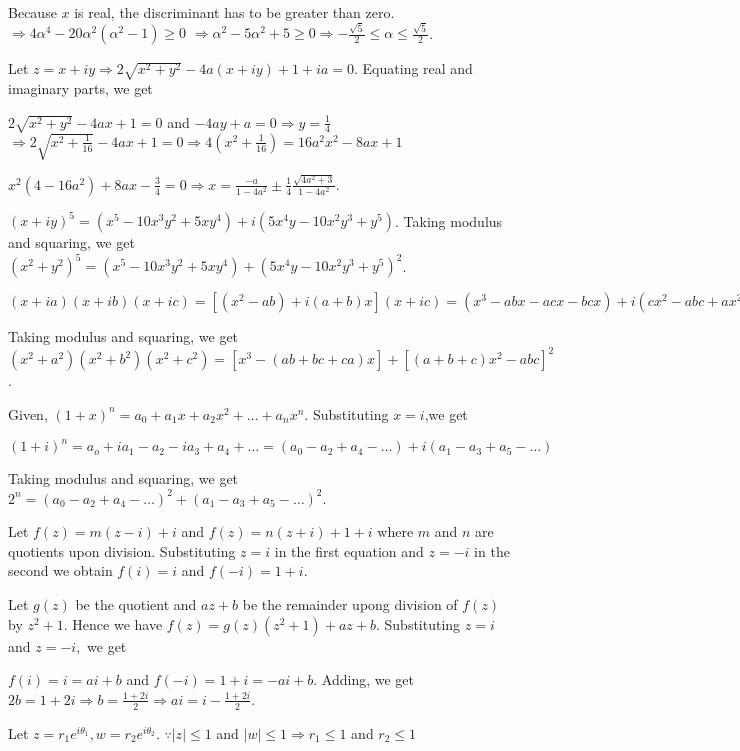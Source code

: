   Because $x$ is real, the discriminant has to be greater than zero.
  $\Rightarrow 4\alpha^4 - 20\alpha^2(\alpha^2 - 1) \geq 0$
  $\Rightarrow \alpha^2 - 5\alpha^2 + 5 \geq 0 \Rightarrow -\frac{\sqrt{5}}{2}\leq\alpha\leq
  \frac{\sqrt{5}}{2}$.
\item Let $z = x + iy \Rightarrow 2\sqrt{x^2 + y^2} - 4a(x + iy) + 1 + ia = 0$.
  Equating real and imaginary parts, we get

  $2\sqrt{x^2 + y^2} - 4ax + 1 = 0$ and $-4ay + a = 0 \Rightarrow y = \frac{1}{4}$
  $\Rightarrow 2\sqrt{x^2 + \frac{1}{16}} - 4ax + 1 = 0 \Rightarrow 4\left(x^2 + \frac{1}{16}\right) =
  16a^2x^2 - 8ax + 1$

  $x^2(4 - 16a^2) + 8ax - \frac{3}{4} = 0 \Rightarrow x = \frac{-a}{1 - 4a^2} \pm
  \frac{1}{4}\frac{\sqrt{4a^2 + 3}}{1 - 4a^2}$.
\item $(x + iy)^5 = (x^5 - 10x^3y^2 + 5xy^4) + i(5x^4y - 10x^2y^3 + y^5)$.
  Taking modulus and squaring, we get
  $(x^2 + y^2)^5 = (x^5 - 10x^3y^2 + 5xy^4) + (5x^4y - 10x^2y^3 + y^5)^2$.
\item $(x + ia)(x + ib)(x + ic) = [(x^2 - ab) + i(a + b)x](x + ic) = (x^3 - abx - acx - bcx) + i(cx^2 - abc
  + ax^2 + bx^2)$

  Taking modulus and squaring, we get $(x^2 + a^2)(x^2 + b^2)(x^2 + c^2) = [x^3 -(ab + bc + ca)x] + [(a + b
    + c)x^2 - abc]^2$.
\item Given, $(1 + x)^n = a_0 + a_1x + a_2x^2 + \ldots + a_nx^n$. Substituting $x = i$,we get

  $(1 + i)^n = a_o + ia_1 - a_2 - ia_3 + a_4 + \ldots = (a_0 - a_2 + a_4 - \ldots) + i(a_1 - a_3 + a_5 -
  \ldots)$

  Taking modulus and squaring, we get $2^n = (a_0 - a_2 + a_4 - \ldots)^2 + (a_1 - a_3 + a_5 - \ldots)^2$.
\item Let $f(z) = m(z - i) + i$ and $f(z) = n(z + i) + 1 + i$ where $m$ and $n$ are quotients upon division.
  Substituting $z = i$ in the first equation and $z = -i$ in the second we obtain $f(i) = i$ and $f(-i) = 1
  + i$.

  Let $g(z)$ be the quotient and $az + b$ be the remainder upong division of $f(z)$ by $z^2 + 1.$ Hence we
  have $f(z) = g(z)(z^2 + 1) + az + b.$ Substituting $z = i$ and $z = -i,$ we get

  $f(i) = i = ai + b$ and $f(-i) = 1 + i = -ai + b$. Adding, we get $2b = 1 + 2i \Rightarrow b = \frac{1 +
    2i}{2} \Rightarrow ai = i - \frac{1 + 2i}{2}$.
\item Let $z = r_1e^{i\theta_1}, w = r_2e^{i\theta_2}$. $\because |z|\leq 1$ and $|w|\leq 1 \Rightarrow
  r_1\leq 1$ and $r_2\leq 1$

